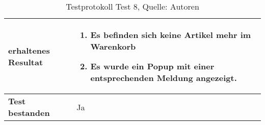 \begin{table}[H]
\begin{tabularx}{\textwidth}{|l|X|}
		\hline
		\textbf{erhaltenes Resultat} &
		\begin{minipage}[t]{0.6\textwidth}
			\begin{enumerate}
				\item Es befinden sich keine Artikel mehr im Warenkorb
				\item Es wurde ein Popup mit einer entsprechenden Meldung angezeigt.  
			\end{enumerate}
		\end{minipage} \\
		\hline
		\textbf{Test bestanden} & Ja \\
		\hline
	\end{tabularx}
	\caption{ \label{tbl: testprotokoll8}Testprotokoll Test 8, Quelle: Autoren}
\end{table}


